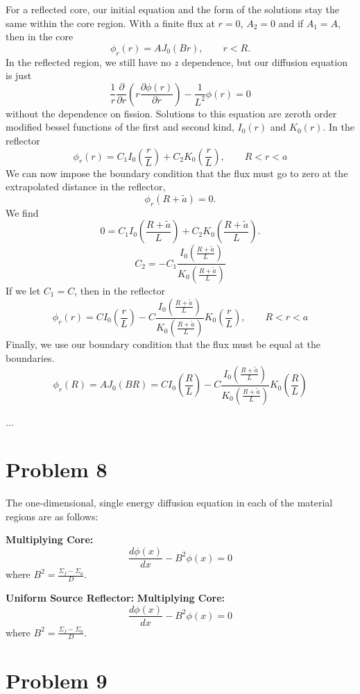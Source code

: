 \documentclass{article}
\newcommand{\p}{\partial}
\newcommand{\Xs}{\Sigma}
\begin{document}
For a reflected core, our initial equation and the form of the solutions stay the same within the core region. 
With a finite flux at $r=0$, $A_2 = 0$ and if $A_1 = A$, then in the core 
$$ \phi_{r}(r) = A J_0(B r), \qquad r<R.$$
In the reflected region, we still have no $z$ dependence, but our diffusion equation is just
$$ \frac{1}{r}\frac{\p}{\p r}\left(r \frac{\p \phi(r)}{\p r}\right) - \frac{1}{L^2}\phi(r) = 0$$
without the dependence on fission. Solutions to this equation are zeroth order modified bessel functions of the first and second kind, $I_0(r)$ and $K_0(r)$.
In the reflector
$$ \phi_{r}(r) = C_1 I_0(\frac{r}{L}) + C_2 K_0(\frac{r}{L}), \qquad R<r<a$$
We can now impose the boundary condition that the flux must go to zero at the extrapolated distance in the reflector,
$$ \phi_{r}(R+\tilde{a}) = 0 .$$
We find
$$ 0 = C_1 I_0(\frac{R+\tilde{a}}{L}) + C_2 K_0(\frac{R+\tilde{a}}{L}) .$$
$$ C_2 = -C_1 \frac{I_0(\frac{R+\tilde{a}}{L})}{K_0(\frac{R+\tilde{a}}{L})} $$
If we let $C_1 = C$, then in the reflector
$$ \phi_{r}(r) = C I_0(\frac{r}{L}) - C \frac{I_0(\frac{R+\tilde{a}}{L})}{K_0(\frac{R+\tilde{a}}{L})} K_0(\frac{r}{L}), \qquad R<r<a$$
Finally, we use our boundary condition that the flux must be equal at the boundaries.
$$ \phi_{r}(R) = A J_0(B R) = C I_0(\frac{R}{L}) - C \frac{I_0(\frac{R+\tilde{a}}{L})}{K_0(\frac{R+\tilde{a}}{L})} K_0(\frac{R}{L}) $$

...


\section*{Problem 8}

The one-dimensional, single energy diffusion equation in each of the material regions are as follows:

\textbf{Multiplying Core:}
$$ \frac{d\phi(x)}{dx} - B^2\phi(x) = 0 $$
where $B^2 = \frac{\Xs_f - \Xs_a}{D}.$ 

\textbf{Uniform Source Reflector:}
\textbf{Multiplying Core:}
$$ \frac{d\phi(x)}{dx} - B^2\phi(x) = 0 $$
where $B^2 = \frac{\Xs_f - \Xs_a}{D}.$ 


\section*{Problem 9}




\end{document}
